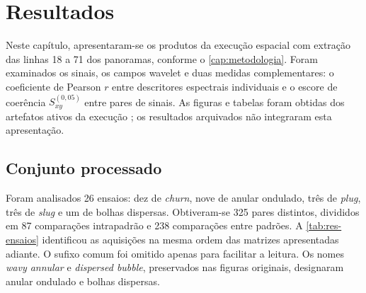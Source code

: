 \chapter{Resultados}\label{cap:resultados}

Neste capítulo, apresentaram-se os produtos da execução espacial com extração das linhas 18 a 71
dos panoramas, conforme o \autoref{cap:metodologia}. Foram examinados os sinais, os campos
wavelet e duas medidas complementares: o coeficiente de Pearson $r$ entre descritores
espectrais individuais e o escore de coerência $S_{xy}^{(0{,}05)}$ entre pares de sinais.
As figuras e tabelas foram obtidas dos artefatos ativos da execução
; os resultados arquivados não integraram esta apresentação.

\section{Conjunto processado}\label{sec:res-visao}

Foram analisados 26 ensaios: dez de \textit{churn}, nove de anular ondulado, três de
\textit{plug}, três de \textit{slug} e um de bolhas dispersas. Obtiveram-se 325 pares
distintos, divididos em 87 comparações intrapadrão e 238 comparações entre padrões.
A \autoref{tab:res-ensaios} identificou as aquisições na mesma ordem das matrizes
apresentadas adiante. O sufixo comum  foi omitido apenas para facilitar
a leitura. Os nomes \textit{wavy annular} e \textit{dispersed bubble}, preservados nas
figuras originais, designaram anular ondulado e bolhas dispersas.

